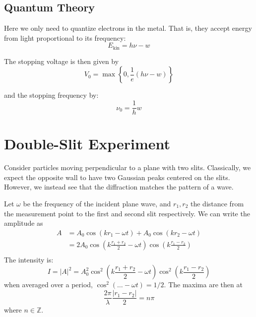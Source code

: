\documentclass{article}
\begin{document}
\subsection{Quantum Theory}
Here we only need to quantize electrons in the metal. That is, they accept energy
from light proportional to its frequency:
\begin{equation*}
	E_{\text{kin}} = h \nu - w
\end{equation*}

The stopping voltage is then given by
\begin{equation*}
	V_0 = \max\left\{ 0, \frac{1}{e}(h\nu - w) \right\}
\end{equation*}

and the stopping frequency by:
\begin{equation*}
	\nu_0 = \frac{1}{h} w
\end{equation*}

\section{Double-Slit Experiment}
Consider particles moving perpendicular to a plane with two slits. Classically, we
expect the opposite wall to have two Gaussian peaks centered on the slits. However,
we instead see that the diffraction matches the pattern of a wave.

Let $\omega$ be the frequency of the incident plane wave, and $r_1,r_2$ the distance
from the measurement point to the first and second slit respectively. We can write
the amplitude as
\begin{equation*}
\begin{split}
	A
		&= A_0 \cos(kr_1 - \omega t) + A_0 \cos(kr_2 - \omega t) \\
		&= 2A_0 \cos\left(k\frac{r_1 + r_2}{2} - \omega t\right)\cos\left(k\frac{r_1-r_2}{2}\right) \\
\end{split}
\end{equation*}
The intensity is:
\begin{equation*}
	I = |A|^2 = A_0^2 \cos^2\left(k\frac{r_1+r_2}{2}-\omega t\right) \cos^2\left(k\frac{r_1-r_2}{2}\right)
\end{equation*}
when averaged over a period, $\cos^2(\dots - \omega t) = 1/2$. The maxima are then
at
\begin{equation*}
	\frac{2\pi}{\lambda} \frac{|r_1-r_2|}{2} = n\pi
\end{equation*}
where $n \in \mathbb{Z}$. 
\end{document}
